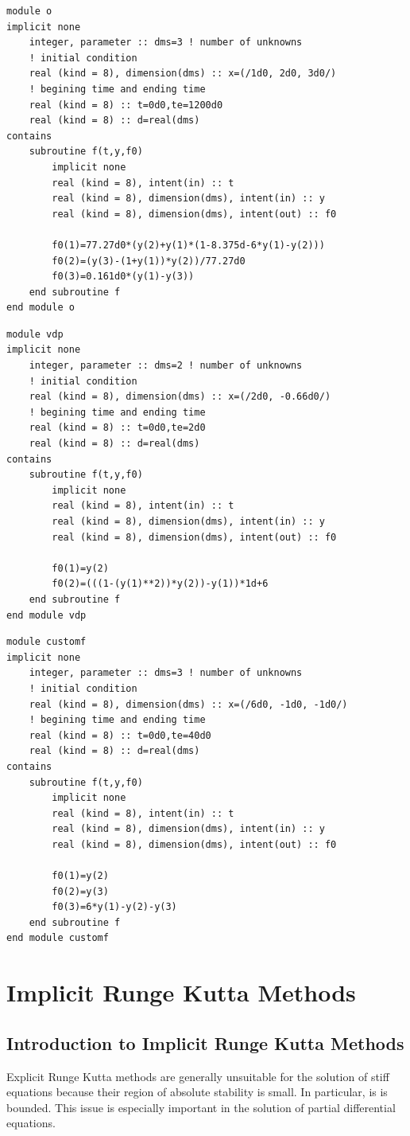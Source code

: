 \documentclass[a4paper,oneside]{book}
\numberwithin{equation}{chapter}
\begin{document}
\begin{lstlisting}
module o  
implicit none 
	integer, parameter :: dms=3 ! number of unknowns
    ! initial condition	
	real (kind = 8), dimension(dms) :: x=(/1d0, 2d0, 3d0/) 
    ! begining time and ending time
	real (kind = 8) :: t=0d0,te=1200d0 
	real (kind = 8) :: d=real(dms)
contains      
	subroutine f(t,y,f0)
		implicit none
		real (kind = 8), intent(in) :: t
		real (kind = 8), dimension(dms), intent(in) :: y
		real (kind = 8), dimension(dms), intent(out) :: f0
		
		f0(1)=77.27d0*(y(2)+y(1)*(1-8.375d-6*y(1)-y(2)))
		f0(2)=(y(3)-(1+y(1))*y(2))/77.27d0
		f0(3)=0.161d0*(y(1)-y(3))
	end subroutine f
end module o 
\end{lstlisting}

\begin{lstlisting}
module vdp  
implicit none 
	integer, parameter :: dms=2 ! number of unknowns
    ! initial condition	
	real (kind = 8), dimension(dms) :: x=(/2d0, -0.66d0/) 
    ! begining time and ending time	
	real (kind = 8) :: t=0d0,te=2d0 
	real (kind = 8) :: d=real(dms)
contains      
	subroutine f(t,y,f0)
		implicit none
		real (kind = 8), intent(in) :: t
		real (kind = 8), dimension(dms), intent(in) :: y
		real (kind = 8), dimension(dms), intent(out) :: f0
		
		f0(1)=y(2)
		f0(2)=(((1-(y(1)**2))*y(2))-y(1))*1d+6
	end subroutine f
end module vdp 
\end{lstlisting}

\begin{lstlisting}
module customf
implicit none 
	integer, parameter :: dms=3 ! number of unknowns
    ! initial condition	
	real (kind = 8), dimension(dms) :: x=(/6d0, -1d0, -1d0/) 
    ! begining time and ending time
	real (kind = 8) :: t=0d0,te=40d0 
	real (kind = 8) :: d=real(dms)
contains      
	subroutine f(t,y,f0)
		implicit none
		real (kind = 8), intent(in) :: t
		real (kind = 8), dimension(dms), intent(in) :: y
		real (kind = 8), dimension(dms), intent(out) :: f0
		
		f0(1)=y(2)
		f0(2)=y(3)
		f0(3)=6*y(1)-y(2)-y(3)
	end subroutine f
end module customf
\end{lstlisting}
\part{Implicit Runge Kutta Methods}
\chapter{Introduction to Implicit Runge Kutta Methods}
Explicit Runge Kutta methods are generally unsuitable for the solution of stiff equations because their region of absolute stability is small. In particular, is is bounded. This issue is especially important in the solution of partial differential equations.
\end{document}
